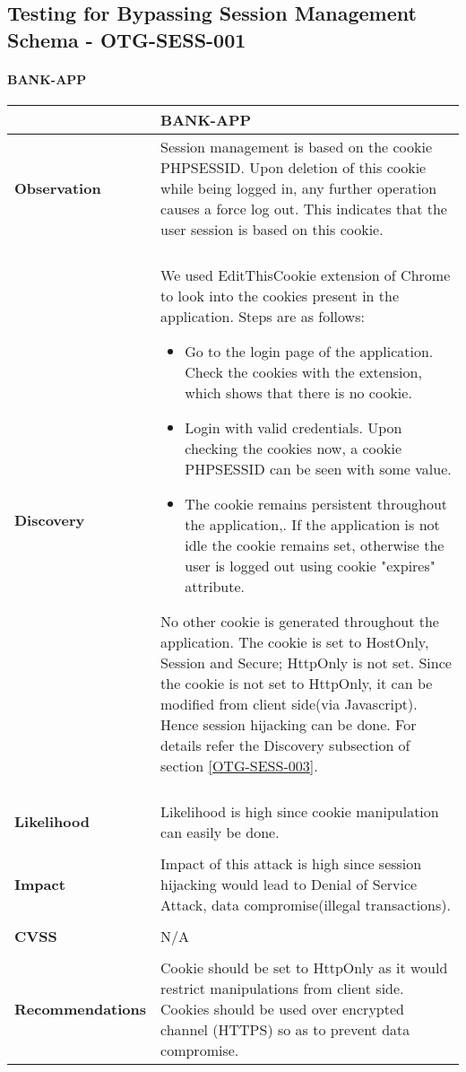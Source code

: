 \subsection{Testing for Bypassing Session Management Schema - OTG-SESS-001}
\paragraph{BANK-APP} \mbox{}
\begin{longtable*}{p{.30\textwidth} | p{.70\textwidth}}
    \hline
    & \textbf{BANK-APP} \\
    \hline
    \textbf{Observation} &
     Session management is based on the cookie PHPSESSID. Upon deletion of this cookie while being logged in, any further operation causes a force log out. This indicates that the user session is based on this cookie.
    \\\\
    \textbf{Discovery} &
       We used EditThisCookie extension of Chrome to look into the cookies present in the application. Steps are as follows:
       \begin{itemize}
       	\item Go to the login page of the application. Check the cookies with the extension, which shows that there is no cookie.
       	
       	\item Login with valid credentials. Upon checking the cookies now, a cookie PHPSESSID can be seen with some value.
       	
       	\item The cookie remains persistent throughout the application,. If the application is not idle the cookie remains set, otherwise the user is logged out using cookie "expires" attribute.
       \end{itemize}
       
       No other cookie is generated throughout the application. The cookie is set to HostOnly, Session and Secure; HttpOnly is not set. Since the cookie is not set to HttpOnly, it can be modified from client side(via Javascript). Hence session hijacking can be done. For details refer the Discovery subsection of section \ref{OTG-SESS-003}.
    \\\\
    \textbf{Likelihood} &
        Likelihood is high since cookie manipulation can easily be done.
    \\\\
    \textbf{Impact} &
      Impact of this attack is high since session hijacking would lead to Denial of Service Attack, data compromise(illegal transactions).
    \\\\
    \textbf{CVSS} &
       N/A
    \\\\
    \textbf{Recommendations} &
      Cookie should be set to HttpOnly as it would restrict manipulations from client side. Cookies should be used over encrypted channel (HTTPS) so as to prevent data compromise.\\
    	\hline
\end{longtable*}

